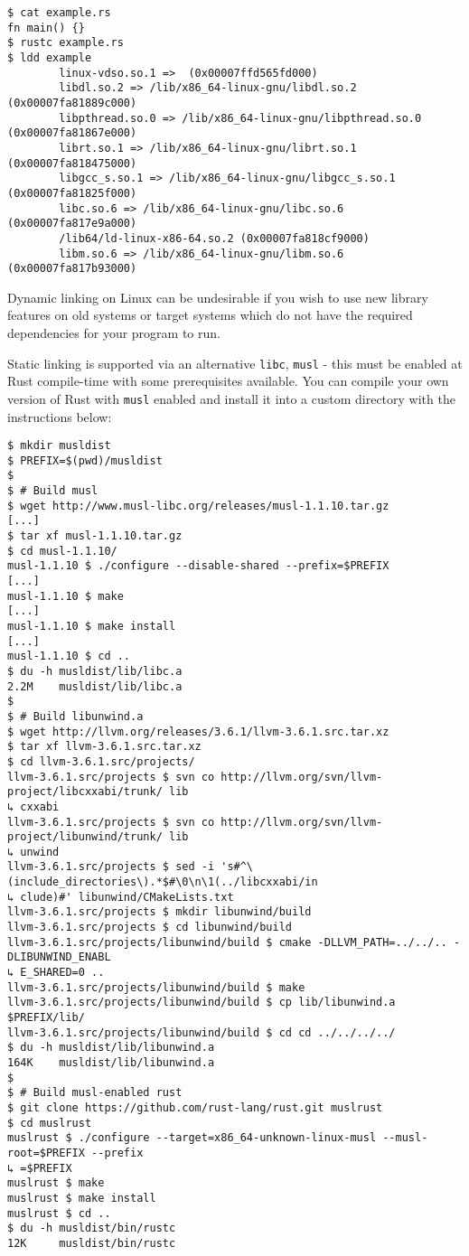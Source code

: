 \documentclass[a4paper,]{book}
\begin{document}
\begin{verbatim}
$ cat example.rs
fn main() {}
$ rustc example.rs
$ ldd example
        linux-vdso.so.1 =>  (0x00007ffd565fd000)
        libdl.so.2 => /lib/x86_64-linux-gnu/libdl.so.2 (0x00007fa81889c000)
        libpthread.so.0 => /lib/x86_64-linux-gnu/libpthread.so.0 (0x00007fa81867e000)
        librt.so.1 => /lib/x86_64-linux-gnu/librt.so.1 (0x00007fa818475000)
        libgcc_s.so.1 => /lib/x86_64-linux-gnu/libgcc_s.so.1 (0x00007fa81825f000)
        libc.so.6 => /lib/x86_64-linux-gnu/libc.so.6 (0x00007fa817e9a000)
        /lib64/ld-linux-x86-64.so.2 (0x00007fa818cf9000)
        libm.so.6 => /lib/x86_64-linux-gnu/libm.so.6 (0x00007fa817b93000)
\end{verbatim}

Dynamic linking on Linux can be undesirable if you wish to use new
library features on old systems or target systems which do not have the
required dependencies for your program to run.

Static linking is supported via an alternative \texttt{libc},
\texttt{musl} - this must be enabled at Rust compile-time with some
prerequisites available. You can compile your own version of Rust with
\texttt{musl} enabled and install it into a custom directory with the
instructions below:

\begin{verbatim}
$ mkdir musldist
$ PREFIX=$(pwd)/musldist
$
$ # Build musl
$ wget http://www.musl-libc.org/releases/musl-1.1.10.tar.gz
[...]
$ tar xf musl-1.1.10.tar.gz
$ cd musl-1.1.10/
musl-1.1.10 $ ./configure --disable-shared --prefix=$PREFIX
[...]
musl-1.1.10 $ make
[...]
musl-1.1.10 $ make install
[...]
musl-1.1.10 $ cd ..
$ du -h musldist/lib/libc.a
2.2M    musldist/lib/libc.a
$
$ # Build libunwind.a
$ wget http://llvm.org/releases/3.6.1/llvm-3.6.1.src.tar.xz
$ tar xf llvm-3.6.1.src.tar.xz
$ cd llvm-3.6.1.src/projects/
llvm-3.6.1.src/projects $ svn co http://llvm.org/svn/llvm-project/libcxxabi/trunk/ lib
↳ cxxabi
llvm-3.6.1.src/projects $ svn co http://llvm.org/svn/llvm-project/libunwind/trunk/ lib
↳ unwind
llvm-3.6.1.src/projects $ sed -i 's#^\(include_directories\).*$#\0\n\1(../libcxxabi/in
↳ clude)#' libunwind/CMakeLists.txt
llvm-3.6.1.src/projects $ mkdir libunwind/build
llvm-3.6.1.src/projects $ cd libunwind/build
llvm-3.6.1.src/projects/libunwind/build $ cmake -DLLVM_PATH=../../.. -DLIBUNWIND_ENABL
↳ E_SHARED=0 ..
llvm-3.6.1.src/projects/libunwind/build $ make
llvm-3.6.1.src/projects/libunwind/build $ cp lib/libunwind.a $PREFIX/lib/
llvm-3.6.1.src/projects/libunwind/build $ cd cd ../../../../
$ du -h musldist/lib/libunwind.a
164K    musldist/lib/libunwind.a
$
$ # Build musl-enabled rust
$ git clone https://github.com/rust-lang/rust.git muslrust
$ cd muslrust
muslrust $ ./configure --target=x86_64-unknown-linux-musl --musl-root=$PREFIX --prefix
↳ =$PREFIX
muslrust $ make
muslrust $ make install
muslrust $ cd ..
$ du -h musldist/bin/rustc
12K     musldist/bin/rustc
\end{verbatim}
\end{document}
